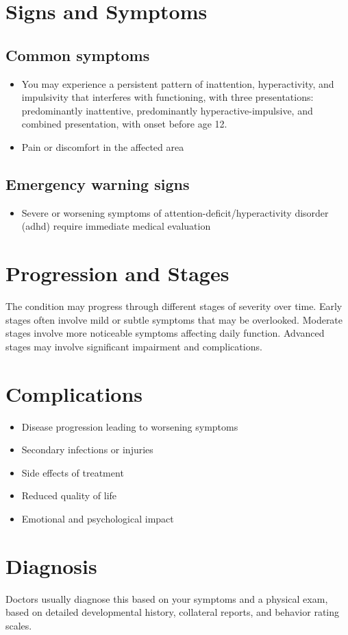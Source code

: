 \section{Signs and Symptoms}
\subsection{Common symptoms}
\begin{itemize}[noitemsep]
  \item You may experience a persistent pattern of inattention, hyperactivity, and impulsivity that interferes with functioning, with three presentations: predominantly inattentive, predominantly hyperactive-impulsive, and combined presentation, with onset before age 12.
  \item Pain or discomfort in the affected area
  \end{itemize}
\subsection{Emergency warning signs}
\begin{itemize}[noitemsep]
  \item Severe or worsening symptoms of attention-deficit/hyperactivity disorder (adhd) require immediate medical evaluation
\end{itemize}
\section{Progression and Stages}
The condition may progress through different stages of severity over time. Early stages often involve mild or subtle symptoms that may be overlooked. Moderate stages involve more noticeable symptoms affecting daily function. Advanced stages may involve significant impairment and complications.
\section{Complications}
\begin{itemize}[noitemsep]
  \item Disease progression leading to worsening symptoms
  \item Secondary infections or injuries
  \item Side effects of treatment
  \item Reduced quality of life
  \item Emotional and psychological impact
\end{itemize}
\section{Diagnosis}
Doctors usually diagnose this based on your symptoms and a physical exam, based on detailed developmental history, collateral reports, and behavior rating scales.

